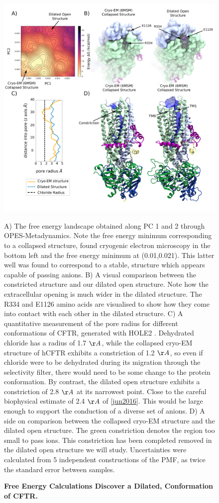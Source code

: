 \begin{figure}
	\begin{center}
		\includegraphics[width=1\textwidth]{figures/opening/summary_dilated_structure_1.pdf}
	\end{center}
	\captionsetup{singlelinecheck = false, justification=raggedright}
	\caption[Free Energy Calculations Discover a Dilated, Conformation of CFTR.] {\textbf{Free Energy Calculations Discover a Dilated, Conformation of CFTR.}}{A) The free energy landscape obtained along PC 1 and 2 through OPES-Metadynamics. Note the free energy minimum corresponding to a collapsed structure, found cryogenic electron microscopy in the bottom left and the free energy minimum at (0.01,0.021). This latter well was found to correspond to a stable, structure which appears capable of passing anions. B) A visual comparison between the constricted structure and our dilated open structure. Note how the extracellular opening is much wider in the dilated structure. The R334 and E1126 amino acids are visualised to show how they come into contact with each other in the dilated structure. C) A quantitative measurement of the pore radius for different conformations of CFTR, generated with HOLE2 \cite{smart1996}. Dehydrated chloride has a radius of 1.7 $\AA$, while the collapsed cryo-EM structure of hCFTR exhibits a constriction of 1.2 $\AA$, so even if chloride were to be dehydrated during its migration through the selectivity filter, there would need to be some change to the protein conformation. By contrast, the dilated open structure exhibits a constriction of 2.8 $\AA$ at its  narrowest point. Close to the careful biophysical estimate of 2.4 $\AA$ of \ref{jun2016}. This would be large enough to support the conduction of a diverse set of anions.  D) A side on comparison between the collapsed cryo-EM structure and the dilated open structure. The green constriction denotes the region too small to pass ions. This constriction has been completed removed in the dilated open structure we will study. Uncertainties were calculated from 5 independent constructions of the PMF, as twice the standard error between samples.}

\end{figure}
